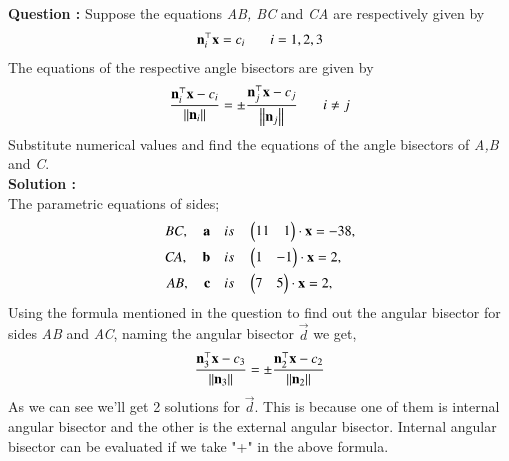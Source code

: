 \documentclass[journal,12pt,twocolumn]{IEEEtran}
\theoremstyle{remark}
\begin{document}
%

\textbf{Question :} Suppose the equations \textit{AB, BC} and \textit{CA} are respectively given by\\
		\begin{align}
			\vec{n}_{i}^{\top} \vec{x} = c_{i} \hspace{0.25in} i = 1,2,3
		\end{align}
		The equations of the respective angle bisectors are given by
		\begin{align}
			\frac{\vec{n}_{i}^{\top} \vec{x}-c_{i}}{\norm{\vec{n}_{i}}}=\pm\frac{\vec{n}_{j}^{\top} \vec{x}-c_{j}}{\norm{\vec{n}_{j}}} \hspace{0.25in}i\neq j 
		\end{align}
		Substitute numerical values and find the equations of the angle bisectors of \textit{A,B} and \textit{C}.\\
\textbf{Solution :}\\
	The parametric equations of sides;\\
	\begin{align*}
	\textit{BC}, \quad \vec{a} & \quad is \quad \myvec{11&1}\cdot\vec{x}=-38,\\
	\textit{CA}, \quad \vec{b} & \quad is \quad \myvec{1&-1}\cdot\vec{x}=2,\\
	\textit{AB}, \quad \vec{c} & \quad is \quad \myvec{7&5}\cdot\vec{x}=2,\\	  
	\end{align*}
	Using the formula mentioned in the question to find out the angular bisector for sides \textit{AB} and \textit{AC}, naming the angular bisector $\vec{d}$ we get,\\
	\begin{align*}
		\frac{\vec{n}_{3}^{\top} \vec{x}-c_{3}}{\norm{\vec{n}_{3}}}=\pm \frac{\vec{n}_{2}^{\top} \vec{x}-c_{2}}{\norm{\vec{n}_{2}}}
	\end{align*}
	As we can see we'll get 2 solutions for $\vec{d}$. This is because one of them is internal angular bisector and the other is the external angular bisector. Internal angular bisector can be evaluated if we take "+" in the above formula.\\
\end{document}

